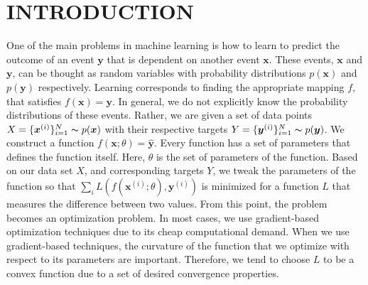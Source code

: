 \documentclass[a4paper,onesided,12pt]{report}
\begin{document}
\begin{abbreviations}
\end{abbreviations}


\chapter{INTRODUCTION}
\label{chapter:intro}
One of the main problems in machine learning is how to learn to predict the outcome of an event $\boldsymbol{y}$ that is dependent on another event $\boldsymbol{x}$. These events, $\boldsymbol{x}$ and $\boldsymbol{y}$, can be thought as random variables with probability distributions $p(\boldsymbol{x})$ and $p(\boldsymbol{y})$ respectively. Learning corresponds to finding the appropriate mapping $f$, that satisfies $f(\boldsymbol{x}) = \boldsymbol{y}$. In general, we do not explicitly know the probability distributions of these events. Rather, we are given a set of data points $X=\{\boldsymbol{x}^{(i)}\}_{i=1}^{N}\thicksim p(\boldsymbol{x})$ with their respective targets $Y=\{\boldsymbol{y}^{(i)}\}_{i=1}^{N}\thicksim p(\boldsymbol{y})$. We construct a function $f(\boldsymbol{x}; \theta)=\hat{\boldsymbol{y}}$. Every function has a set of parameters that defines the function itself. Here, $\theta$ is the set of parameters of the function. Based on our data set $X$, and corresponding targets $Y$, we tweak the parameters of the function so that $\sum_i L(f(\boldsymbol{x}^{(i)}; \theta), \boldsymbol{y}^{(i)})$ is minimized for a function $L$ that measures the difference between two values. From this point, the problem becomes an optimization problem. In most cases, we use gradient-based optimization techniques due to its cheap computational demand. When we use gradient-based techniques, the curvature of the function that we optimize with respect to its parameters are important. Therefore, we tend to choose $L$ to be a convex function due to a set of desired convergence properties.
\end{document}
